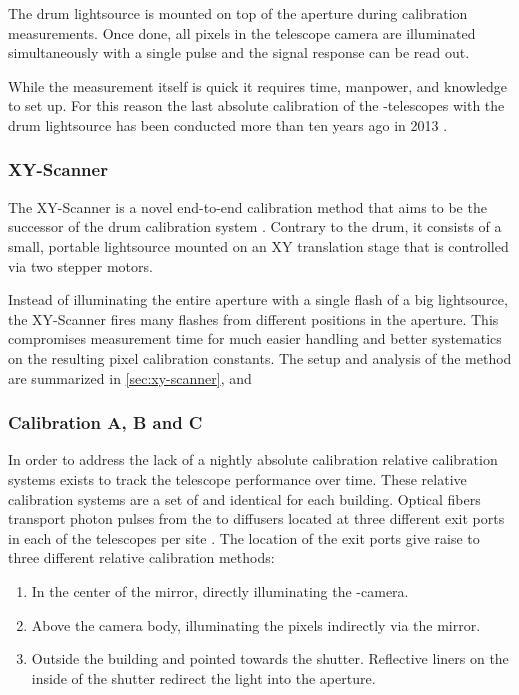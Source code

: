 The drum lightsource is mounted on top of the \FD aperture during calibration 
measurements. Once done, all pixels in the telescope camera are illuminated 
simultaneously with a single \LED pulse and the signal response can be read 
out.

While the measurement itself is quick it requires time, manpower, and knowledge
to set up. For this reason the last absolute calibration of the \FD-telescopes 
with the drum lightsource has been conducted more than ten years ago in 2013 
\cite{dorofeevFDAbsoluteCalibration2013}. 

\subsubsection{XY-Scanner}
\label{sssec:xy-scanner}

The XY-Scanner is a novel end-to-end calibration method that aims to be the
successor of the drum calibration system 
\cite{engelNewEndtoendCalibration2017}. Contrary to the drum, it consists of a
small, portable \IS lightsource mounted on an XY translation stage that is 
controlled via two stepper motors.

Instead of illuminating the entire aperture with a single flash of a big 
lightsource, the XY-Scanner fires many flashes from different positions in the 
aperture. This compromises measurement time for much easier handling and better
systematics on the resulting pixel calibration constants. The setup and 
analysis of the method are summarized in \cref{sec:xy-scanner}, and
\cite{schaferXYScannerVersatileMethod2023}

\subsubsection{Calibration A, B and C}
\label{sssec:relative-calibration}

In order to address the lack of a nightly absolute calibration relative 
calibration systems exists to track the telescope performance over time. These 
relative calibration systems are a set of \LCUs and identical for each 
building. Optical fibers transport photon pulses from the \LCU to diffusers 
located at three different exit ports in each of the telescopes per \FD site 
\cite{robertsCalibrationPierreAuger2003}. The location of the exit ports give 
raise to three different relative calibration methods:

\begin{enumerate}[label=(\Alph*)]
	\item In the center of the mirror, directly illuminating the 
	\FD-camera.
	\item Above the camera body, illuminating the pixels indirectly via the
	mirror.
	\item Outside the \FD building and pointed towards the shutter.
	Reflective liners on the inside of the shutter redirect the light into 
	the aperture.
\end{enumerate}


